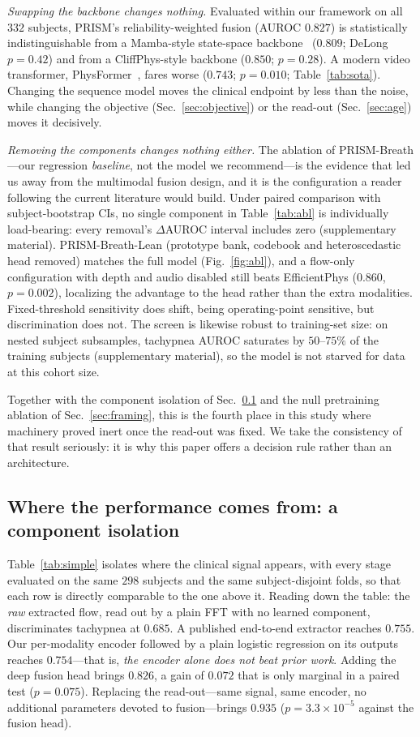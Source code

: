 \documentclass[journal]{IEEEtran}
\begin{document}
\emph{Swapping the backbone changes nothing.} Evaluated within our framework on all $332$ subjects,
PRISM's reliability-weighted fusion (AUROC $0.827$) is statistically indistinguishable from a
Mamba-style state-space backbone~\cite{mamba_gu} ($0.809$; DeLong $p=0.42$) and from a CliffPhys-style
backbone ($0.850$; $p=0.28$). A modern video transformer, PhysFormer~\cite{yu_physformer}, fares worse
($0.743$; $p=0.010$; Table~\ref{tab:sota}). Changing the sequence model moves the clinical endpoint by
less than the noise, while changing the objective (Sec.~\ref{sec:objective}) or the read-out
(Sec.~\ref{sec:age}) moves it decisively.

\emph{Removing the components changes nothing either.} The ablation of PRISM-Breath---our regression
\emph{baseline}, not the model we recommend---is the evidence that led us away from the multimodal
fusion design, and it is the configuration a reader following the current literature would build. Under
paired comparison with subject-bootstrap CIs, no single component in Table~\ref{tab:abl} is individually
load-bearing: every removal's $\Delta$AUROC interval includes zero (supplementary material). PRISM-Breath-Lean (prototype
bank, codebook and heteroscedastic head removed) matches the full model (Fig.~\ref{fig:abl}), and a
flow-only configuration with depth and audio disabled still beats EfficientPhys ($0.860$, $p=0.002$),
localizing the advantage to the head rather than the extra modalities. Fixed-threshold sensitivity does
shift, being operating-point sensitive, but discrimination does not. The screen is likewise robust to
training-set size: on nested subject subsamples, tachypnea AUROC saturates by $50$--$75\%$ of the
training subjects (supplementary material), so the model is not starved for data at this cohort size.

Together with the component isolation of Sec.~\ref{sec:simple} and the null pretraining ablation of
Sec.~\ref{sec:framing}, this is the fourth place in this study where machinery proved inert once the
read-out was fixed. We take the consistency of that result seriously: it is why this paper offers a
decision rule rather than an architecture.

\subsection{Where the performance comes from: a component isolation}\label{sec:simple}
Table~\ref{tab:simple} isolates where the clinical signal appears, with every stage evaluated on the
same $298$ subjects and the same subject-disjoint folds, so that each row is directly comparable to the
one above it. Reading down the table: the \emph{raw} extracted flow, read out by a plain FFT with no
learned component, discriminates tachypnea at $0.685$. A published end-to-end extractor reaches $0.755$.
Our per-modality encoder followed by a plain logistic regression on its outputs reaches $0.754$---that
is, \emph{the encoder alone does not beat prior work}. Adding the deep fusion head brings $0.826$, a gain
of $0.072$ that is only marginal in a paired test ($p=0.075$). Replacing the read-out---same signal, same
encoder, no additional parameters devoted to fusion---brings $0.935$ ($p=3.3{\times}10^{-5}$ against the
fusion head).
\end{document}

